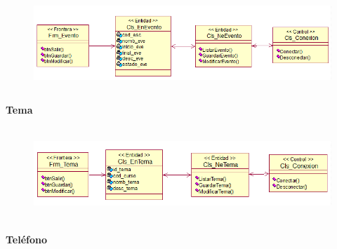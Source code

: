 \documentclass[12pt]{report}
\begin{document}
\begin{itemize}

\begin{figure}[H]
	\begin{Center}
		\includegraphics[width=6.33in,height=1.41in]{./media/image15.png}
	\end{Center}
\end{figure}



\par

{\fontsize{10pt}{12.0pt}\selectfont \textbf{Tema}\par}\par




\begin{figure}[H]
	\begin{Center}
		\includegraphics[width=6.33in,height=1.38in]{./media/image16.png}
	\end{Center}
\end{figure}



\par

{\fontsize{10pt}{12.0pt}\selectfont \textbf{Teléfono}\par}\par





\end{itemize}
\end{document}
